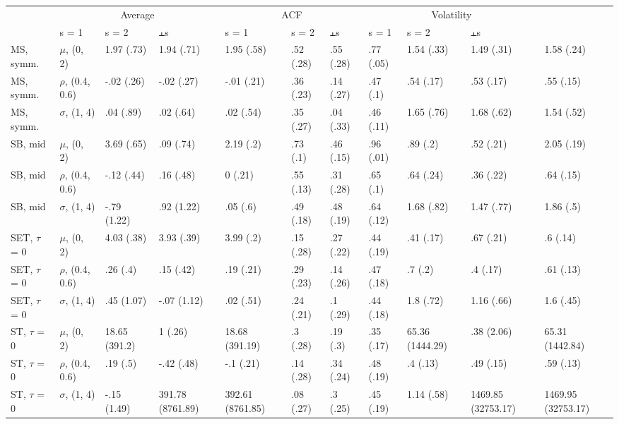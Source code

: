 \begin{table}[t]
\fontsize{12.0pt}{14.0pt}\selectfont
\begin{tabular*}{\linewidth}{@{\extracolsep{\fill}}l|llllllllll}
\toprule
 & \multicolumn{3}{c}{Average} & \multicolumn{3}{c}{ACF} & \multicolumn{3}{c}{Volatility} \\ 
\cmidrule(lr){2-4} \cmidrule(lr){5-7} \cmidrule(lr){8-10}
 & s = 1 & s = 2 & ⫠s & s = 1 & s = 2 & ⫠s & s = 1 & s = 2 & ⫠s \\ 
\midrule\addlinespace[2.5pt]
MS, symm. & \ensuremath{\mu}, (0, 2) & 1.97 (.73) & 1.94 (.71) & 1.95 (.58) & .52 (.28) & .55 (.28) & .77 (.05) & 1.54 (.33) & 1.49 (.31) & 1.58 (.24) \\ 
MS, symm. & \ensuremath{\rho}, (0.4, 0.6) & -.02 (.26) & -.02 (.27) & -.01 (.21) & .36 (.23) & .14 (.27) & .47 (.1) & .54 (.17) & .53 (.17) & .55 (.15) \\ 
MS, symm. & \ensuremath{\sigma}, (1, 4) & .04 (.89) & .02 (.64) & .02 (.54) & .35 (.27) & .04 (.33) & .46 (.11) & 1.65 (.76) & 1.68 (.62) & 1.54 (.52) \\ 
SB, mid & \ensuremath{\mu}, (0, 2) & 3.69 (.65) & .09 (.74) & 2.19 (.2) & .73 (.1) & .46 (.15) & .96 (.01) & .89 (.2) & .52 (.21) & 2.05 (.19) \\ 
SB, mid & \ensuremath{\rho}, (0.4, 0.6) & -.12 (.44) & .16 (.48) & 0 (.21) & .55 (.13) & .31 (.28) & .65 (.1) & .64 (.24) & .36 (.22) & .64 (.15) \\ 
SB, mid & \ensuremath{\sigma}, (1, 4) & -.79 (1.22) & .92 (1.22) & .05 (.6) & .49 (.18) & .48 (.19) & .64 (.12) & 1.68 (.82) & 1.47 (.77) & 1.86 (.5) \\ 
SET, \ensuremath{\tau} = 0 & \ensuremath{\mu}, (0, 2) & 4.03 (.38) & 3.93 (.39) & 3.99 (.2) & .15 (.28) & .27 (.22) & .44 (.19) & .41 (.17) & .67 (.21) & .6 (.14) \\ 
SET, \ensuremath{\tau} = 0 & \ensuremath{\rho}, (0.4, 0.6) & .26 (.4) & .15 (.42) & .19 (.21) & .29 (.23) & .14 (.26) & .47 (.18) & .7 (.2) & .4 (.17) & .61 (.13) \\ 
SET, \ensuremath{\tau} = 0 & \ensuremath{\sigma}, (1, 4) & .45 (1.07) & -.07 (1.12) & .02 (.51) & .24 (.21) & .1 (.29) & .44 (.18) & 1.8 (.72) & 1.16 (.66) & 1.6 (.45) \\ 
ST, \ensuremath{\tau} = 0 & \ensuremath{\mu}, (0, 2) & 18.65 (391.2) & 1 (.26) & 18.68 (391.19) & .3 (.28) & .19 (.3) & .35 (.17) & 65.36 (1444.29) & .38 (2.06) & 65.31 (1442.84) \\ 
ST, \ensuremath{\tau} = 0 & \ensuremath{\rho}, (0.4, 0.6) & .19 (.5) & -.42 (.48) & -.1 (.21) & .14 (.28) & .34 (.24) & .48 (.19) & .4 (.13) & .49 (.15) & .59 (.13) \\ 
ST, \ensuremath{\tau} = 0 & \ensuremath{\sigma}, (1, 4) & -.15 (1.49) & 391.78 (8761.89) & 392.61 (8761.85) & .08 (.27) & .3 (.25) & .45 (.19) & 1.14 (.58) & 1469.85 (32753.17) & 1469.95 (32753.17) \\ 
\bottomrule
\end{tabular*}
\end{table}

